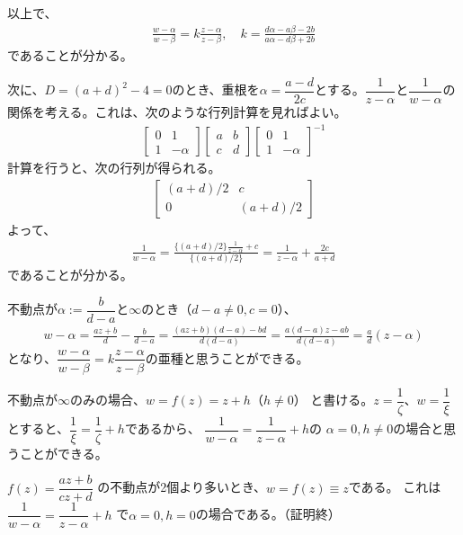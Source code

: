 以上で、
\begin{align*}
    \frac{w-\alpha}{w-\beta}
    =k\frac{z-\alpha}{z-\beta},\quad
    k=\frac{d\alpha-a\beta-2b}{a\alpha-d\beta+2b}
\end{align*}
であることが分かる。

次に、$D=(a+d)^2-4=0$のとき、重根を$\alpha=\dfrac{a-d}{2c}$とする。$\dfrac{1}{z-\alpha}$と$\dfrac{1}{w-\alpha}$の関係を考える。これは、次のような行列計算を見ればよい。
\begin{align*}
    \begin{bmatrix}
        0&1\\
        1&-\alpha
    \end{bmatrix}
    \begin{bmatrix}
        a&b\\
        c&d
    \end{bmatrix}
    \begin{bmatrix}
        0&1\\
        1&-\alpha
    \end{bmatrix}^{-1}
\end{align*}
計算を行うと、次の行列が得られる。
\begin{align*}
    \begin{bmatrix}
        (a+d)/2&c\\
        0&(a+d)/2
    \end{bmatrix}
\end{align*}
よって、
\begin{align*}
    \frac{1}{w-\alpha}
    =\frac{\{(a+d)/2\}\frac{1}{z-\alpha}+c}{\{(a+d)/2\}}
    =\frac{1}{z-\alpha}+\frac{2c}{a+d}
\end{align*}
であることが分かる。

不動点が$\alpha:=\dfrac{b}{d-a}$と$\infty$のとき（$d-a\neq0,c=0$）、
\begin{align*}
    w-\alpha
    =\frac{az+b}{d}-\frac{b}{d-a}
    =\frac{(az+b)(d-a)-bd}{d(d-a)}
    =\frac{a(d-a)z-ab}{d(d-a)}
    =\frac{a}{d}(z-\alpha)
\end{align*}
となり、$\dfrac{w-\alpha}{w-\beta}=k\dfrac{z-\alpha}{z-\beta}$の亜種と思うことができる。

不動点が$\infty$のみの場合、$w=f(z)=z+h$（$h\neq0$）
と書ける。$z=\dfrac{1}{\zeta}$、$w=\dfrac{1}{\xi}$とすると、$\dfrac{1}{\xi}=\dfrac{1}{\zeta}+h$であるから、
$\dfrac{1}{w-\alpha}=\dfrac{1}{z-\alpha}+h$の
$\alpha=0,h\neq0$の場合と思うことができる。

$f(z)=\dfrac{az+b}{cz+d}$
の不動点が2個より多いとき、$w=f(z)\equiv z$である。
これは
$\dfrac{1}{w-\alpha}=\dfrac{1}{z-\alpha}+h$
で$\alpha=0,h=0$の場合である。（証明終）